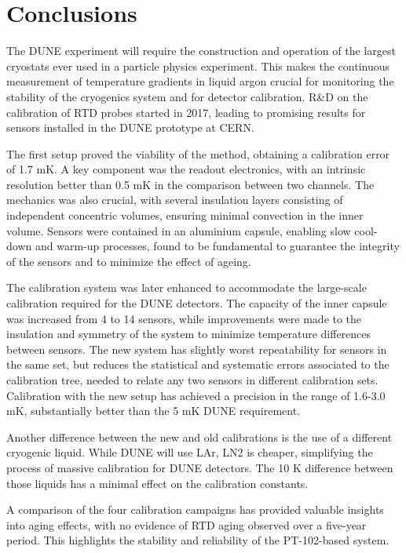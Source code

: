 \section{Conclusions}
\label{conclusions}

\noindent The DUNE experiment will require the construction and operation of the largest cryostats ever used in a particle physics experiment. This makes the continuous measurement of temperature gradients in liquid argon crucial for monitoring the stability of the cryogenics system and for detector calibration. R\&D on the calibration of RTD probes started in 2017, leading to promising results for sensors installed in the DUNE prototype at CERN.

The first setup proved the viability of the method, obtaining a calibration error of 1.7 mK. A key component was the readout electronics, with an intrinsic resolution better than 0.5 mK in the comparison between two channels. The mechanics was also crucial, with several insulation layers consisting of independent concentric volumes, ensuring minimal convection in the inner volume. Sensors were contained in an aluminium capsule, enabling slow cool-down and warm-up processes, found to be fundamental to guarantee the integrity of the sensors and to minimize the effect of ageing.

The calibration system was later enhanced to accommodate the large-scale calibration required for the DUNE detectors. The capacity of the inner capsule was increased from 4 to 14 sensors, while improvements were made to the insulation and symmetry of the system to minimize temperature differences between sensors. The new system has slightly worst repeatability for sensors in the same set, but reduces the statistical and systematic errors associated to the calibration tree, needed to relate any two sensors in different calibration sets. Calibration with the new setup has achieved a precision in the range of 1.6-3.0 mK, substantially better than the 5 mK DUNE requirement.

Another difference between the new and old calibrations is the use of a different cryogenic liquid. While DUNE will use LAr, LN2 is cheaper, simplifying the process of massive calibration for DUNE detectors. The 10 K difference between those liquids has a minimal effect on the calibration constants.

A comparison of the four calibration campaigns has provided valuable insights into aging effects, with no evidence of RTD aging observed over a five-year period. This highlights the stability and reliability of the PT-102-based system.